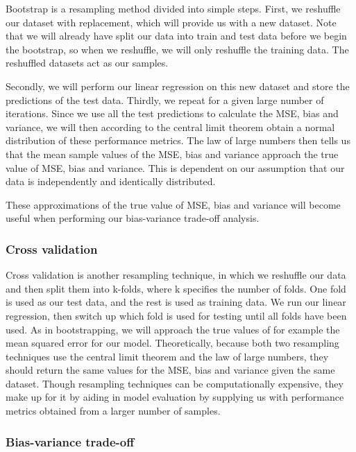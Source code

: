 \documentclass[twocolumn,10pt,cleanfoot]{asme2ej}
\begin{document}
Bootstrap is a resampling method divided into simple steps. First, we reshuffle our dataset with replacement, which will provide us with a new dataset. Note that we will already have split our data into train and test data before we begin the bootstrap, so when we reshuffle, we will only reshuffle the training data. The reshuffled datasets act as our samples.

Secondly, we will perform our linear regression on this new dataset and store the predictions of the test data. Thirdly, we repeat for a given large number of iterations. Since we use all the test predictions to calculate the MSE, bias and variance, we will then according to the central limit theorem \cite{CLT} obtain a normal distribution of these performance metrics. The law of large numbers \cite{LLN} then tells us that the mean sample values of the MSE, bias and variance approach the true value of MSE, bias and variance. This is dependent on our assumption that our data is independently and identically distributed.

These approximations of the true value of MSE, bias and variance will become useful when performing our bias-variance trade-off analysis.


\subsubsection{Cross validation}

Cross validation is another resampling technique, in which we reshuffle our data and then split them into k-folds, where k specifies the number of folds. One fold is used as our test data, and the rest is used as training data. We run our linear regression, then switch up which fold is used for testing until all folds have been used. As in bootstrapping, we will approach the true values of for example the mean squared error for our model. 
Theoretically, because both two resampling techniques use the central limit theorem and the law of large numbers, they should return the same values for the MSE, bias and variance given the same dataset. Though resampling techniques can be computationally expensive, they make up for it by aiding in model evaluation by supplying us with performance metrics obtained from a larger number of samples. 

\subsubsection{Bias-variance trade-off}
\end{document}
